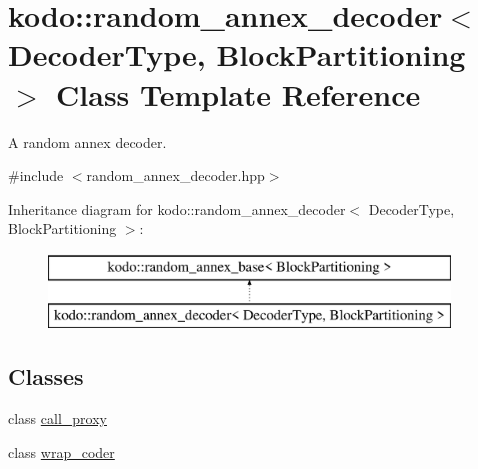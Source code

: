 \hypertarget{classkodo_1_1random__annex__decoder}{\section{kodo\-:\-:random\-\_\-annex\-\_\-decoder$<$ Decoder\-Type, Block\-Partitioning $>$ Class Template Reference}
\label{classkodo_1_1random__annex__decoder}
}


A random annex decoder.  




{\ttfamily \#include $<$random\-\_\-annex\-\_\-decoder.\-hpp$>$}

Inheritance diagram for kodo\-:\-:random\-\_\-annex\-\_\-decoder$<$ Decoder\-Type, Block\-Partitioning $>$\-:\begin{figure}[H]
\begin{center}
\leavevmode
\includegraphics[height=2.000000cm]{classkodo_1_1random__annex__decoder}
\end{center}
\end{figure}
\subsection*{Classes}
\begin{DoxyCompactItemize}
\item 
class \hyperlink{classkodo_1_1random__annex__decoder_1_1call__proxy}{call\-\_\-proxy}
\item 
class \hyperlink{classkodo_1_1random__annex__decoder_1_1wrap__coder}{wrap\-\_\-coder}
\end{DoxyCompactItemize}

